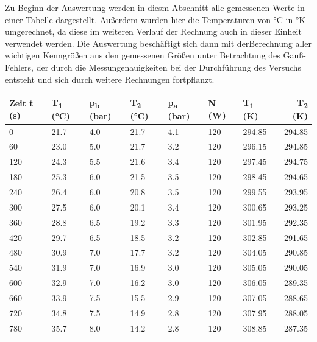 \documentclass[titlepage=firstcover, captions=tableheading]{scrartcl}
\begin{document}
Zu Beginn der Auswertung werden in diesm Abschnitt alle gemessenen Werte in einer Tabelle dargestellt. Außerdem wurden hier die Temperaturen von °C in °K umgerechnet,
da diese im weiteren Verlauf der Rechnung auch in dieser Einheit verwendet werden.
Die Auswertung beschäftigt sich dann mit derBerechnung aller wichtigen Kenngrößen aus den gemessenen Größen unter Betrachtung des Gauß-Fehlers, 
der durch die Messungenauigkeiten bei der Durchführung des Versuchs entsteht und sich durch weitere Rechnungen fortpflanzt. 
\noindent
\begin{minipage}{\linewidth}
\begin{center}
        \begin{tabular}{lllllllr}  
            \toprule
            Zeit t (s)    & T\textsubscript{1} (°C) & p\textsubscript{b} (bar) & T\textsubscript{2} (°C) & p\textsubscript{a} (bar) & N (W) & T\textsubscript{1} (K) 
            & T\textsubscript{2} (K) \\
            \midrule
            0   	&   21.7 & 4.0 &    21.7 &  4.1 &   120   & 294.85 & 294.85 \\
            60  	&   23.0 & 5.0 &	21.7 &  3.2	&   120   & 296.15 & 294.85  \\
            120 	&   24.3 & 5.5 &	21.6 &	3.4	&   120   & 297.45 & 294.75  \\
            180 	&   25.3 & 6.0 &	21.5 &	3.5	&   120   & 298.45 &  294.65 \\
            240 	&   26.4 & 6.0 & 	20.8 &	3.5	&   120   & 299.55 & 293.95  \\
            300 	&   27.5 & 6.0 & 	20.1 &	3.4 &	120   & 300.65 & 293.25  \\
            360 	&   28.8 & 6.5 & 	19.2 &	3.3 &	120   & 301.95 & 292.35  \\
            420 	&   29.7 & 6.5 & 	18.5 &	3.2 &	120   & 302.85 & 291.65  \\
            480 	&   30.9 & 7.0 & 	17.7 &	3.2 &	120   & 304.05 & 290.85  \\
            540 	&   31.9 & 7.0 & 	16.9 &	3.0 &	120   & 305.05 & 290.05  \\
            600 	&   32.9 & 7.0 & 	16.2 &	3.0 &	120   & 306.05 & 289.35    \\
            660 	&   33.9 & 7.5 & 	15.5 &	2.9 &	120   & 307.05 & 288.65  \\
            720 	&   34.8 & 7.5 &	14.9 &	2.8 &	120   & 307.95 & 288.05  \\
            780 	&   35.7 & 8.0 & 	14.2 &	2.8 &	120   & 308.85 & 287.35 \\

\end{tabular}
\end{center}
\end{minipage}
\end{document}
